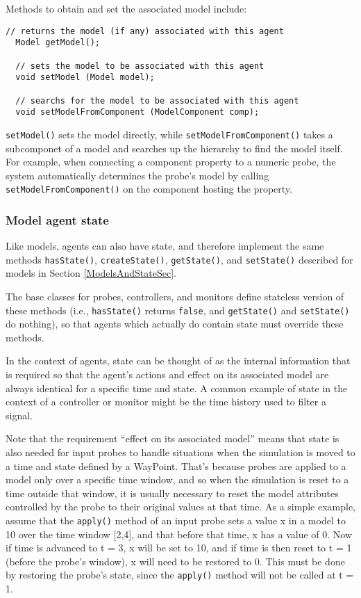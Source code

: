 \documentclass{article}
\begin{document}
Methods to obtain and set the associated model include:
\begin{lstlisting}[]
  // returns the model (if any) associated with this agent
  Model getModel();

  // sets the model to be associated with this agent
  void setModel (Model model);

  // searchs for the model to be associated with this agent
  void setModelFromComponent (ModelComponent comp);
\end{lstlisting}
{\tt setModel()} sets the model directly, while {\tt setModelFromComponent()}
takes a subcomponet of a model and searches up the hierarchy to find
the model itself. For example, when connecting a component property to
a numeric probe, the system automatically determines the probe's model
by calling {\tt setModelFromComponent()} on the component hosting the
property.

\subsubsection{Model agent state}
\label{ModelAgentState}

Like models, agents can also have state, and therefore implement the
same methods {\tt hasState()}, {\tt createState()}, {\tt getState()},
and {\tt setState()} described for models in Section
\ref{ModelsAndStateSec}.

The base classes for probes, controllers, and monitors define
stateless version of these methods (i.e., {\tt hasState()} returns
{\tt false}, and {\tt getState()} and {\tt setState()} do nothing), so
that agents which actually do contain state must override these
methods.

In the context of agents, state can be thought of as the internal
information that is required so that the agent's actions and effect on
its associated model are always identical for a specific time and
state.  A common example of state in the context of a controller or
monitor might be the time history used to filter a signal.

Note that the requirement ``effect on its associated model'' means
that state is also needed for input probes to handle situations when
the simulation is moved to a time and state defined by a
WayPoint. That's because probes are applied to a model only over a
specific time window, and so when the simulation is reset to a time
outside that window, it is usually necessary to reset the model
attributes controlled by the probe to their original values at that
time. As a simple example, assume that the {\tt apply()} method of an
input probe sets a value x in a model to 10 over the time window
[2,4], and that before that time, x has a value of 0. Now
if time is advanced to t = 3, x will be set to 10, and if time is then
reset to t = 1 (before the probe's window), x will need to be restored
to 0. This must be done by restoring the probe's
state, since the {\tt apply()} method will not be called at t = 1.
\end{document}
